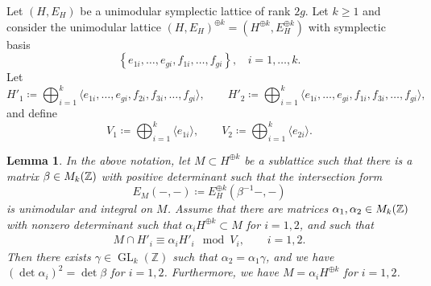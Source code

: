 \documentclass[a4paper,11pt,reqno]{amsart}
\numberwithin{equation}{section}
\theoremstyle{plain}
\newtheorem{lemma}[theorem]{Lemma}
\theoremstyle{definition}
\newcommand{\Z}{\mathbb Z}
\let\rm\relax
\newcommand{\rm}[1]{{\mathrm{#1}}}
\newcommand{\GL}{\operatorname{GL}}
\newcommand{\set}[1]{\left\{ #1 \right\}}
\begin{document}
Let $(H,E_H)$ be a unimodular symplectic lattice of rank $2g$.
Let $k\geq 1$ and consider the unimodular lattice $(H,E_H)^{\oplus k}=(H^{\oplus k},E_H^{\oplus k})$ with symplectic basis 
$$
\set{ e_{1i},\dots ,e_{gi},f_{1i},\dots ,f_{gi}}, \ \ \ \ i=1,\dots ,k.
$$
Let 
$$
H'_1\coloneqq \bigoplus_{i=1}^k \langle e_{1i},\dots ,e_{gi},f_{2i},f_{3i},\dots ,f_{gi}\rangle, \quad \quad 
H'_2\coloneqq \bigoplus_{i=1}^k \langle e_{1i},\dots ,e_{gi},f_{1i},f_{3i},\dots ,f_{gi}\rangle ,
$$
and define
$$
V_1 \coloneqq\bigoplus_{i = 1}^k \langle e_{1i} \rangle, \quad \quad 
V_2 \coloneqq \bigoplus_{i = 1}^k \langle e_{2i} \rangle. 
$$

\begin{lemma} \label{lemma:appendix-k=arbitrary-new}
In the above notation, let $M\subset H^{\oplus k}$ be a sublattice such that there is a matrix $\beta\in \rm{M}_k(\Z)$ with positive determinant such that the intersection form $$
E_M(-,-)\coloneqq E_H^{\oplus k}(\beta^{-1}-,-)
$$ 
is unimodular and integral on $M$. Assume that there are matrices $\alpha_1, \alpha_2 \in \rm{M}_k(\Z)$ with nonzero determinant such that $\alpha_i H^{\oplus k}\subset M$ for $i = 1,2$, and such that \begin{align}\label{align:appendix:mcapH'modV:k=arbitrary}M\cap H'_i\equiv \alpha_i H'_i \mod V_i, \quad \quad i = 1,2.\end{align}
Then there exists $\gamma \in \GL_k(\Z)$ such that $\alpha_2 = \alpha_1 \gamma$, and we have $(\det \alpha_i)^2= \det \beta$ for $i = 1,2$. Furthermore, we have $M=\alpha_i H^{\oplus k}$ for $i = 1,2$. 
\end{lemma}
\end{document}
